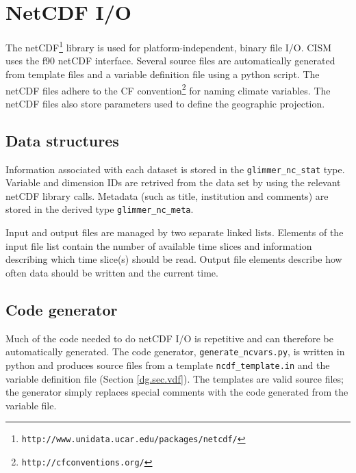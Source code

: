 \section{NetCDF I/O}
\label{app:netcdfio}
The netCDF\footnote{\texttt{http://www.unidata.ucar.edu/packages/netcdf/}} library 
is used for platform-independent, binary file I/O. CISM uses the f90 netCDF interface. 
Several source files are automatically generated from template files and 
a variable definition file using a python script. The netCDF files adhere to the 
CF convention\footnote{\texttt{http://cfconventions.org/}}
for naming climate variables. The netCDF files also store parameters used to define the geographic projection.


\subsection{Data structures}
Information associated with each dataset is stored in the \texttt{glimmer\_nc\_stat} type. 
Variable and dimension IDs are retrived from the data set by using the relevant netCDF library calls. 
Metadata (such as title, institution and comments) are stored in the derived type \texttt{glimmer\_nc\_meta}.

Input and output files are managed by two separate linked lists. Elements of the input file list contain the number of available time slices and information describing which time slice(s) should be read. Output file elements describe how often data should be written and the current time.

\subsection{Code generator}
Much of the code needed to do netCDF I/O is repetitive and can therefore 
be automatically generated. The code generator, \texttt{generate\_ncvars.py}, 
is written in python and produces source files from a template \texttt{ncdf\_template.in} 
and the variable definition file (Section \ref{dg.sec.vdf}). The templates are
valid source files; the generator simply replaces special comments with 
the code generated from the variable file. 

